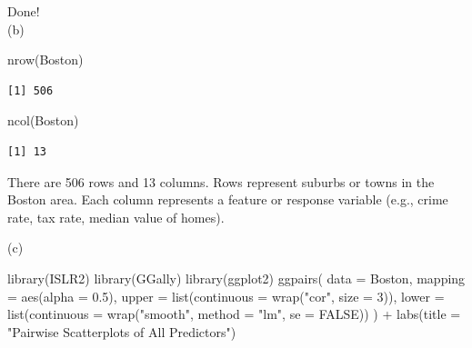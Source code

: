 \documentclass[
]{article}
\newenvironment{Shaded}{\begin{snugshade}}{\end{snugshade}}
\newcommand{\AttributeTok}[1]{\textcolor[rgb]{0.40,0.45,0.13}{#1}}
\newcommand{\ConstantTok}[1]{\textcolor[rgb]{0.56,0.35,0.01}{#1}}
\newcommand{\DecValTok}[1]{\textcolor[rgb]{0.68,0.00,0.00}{#1}}
\newcommand{\FloatTok}[1]{\textcolor[rgb]{0.68,0.00,0.00}{#1}}
\newcommand{\FunctionTok}[1]{\textcolor[rgb]{0.28,0.35,0.67}{#1}}
\newcommand{\NormalTok}[1]{\textcolor[rgb]{0.00,0.23,0.31}{#1}}
\newcommand{\SpecialCharTok}[1]{\textcolor[rgb]{0.37,0.37,0.37}{#1}}
\newcommand{\StringTok}[1]{\textcolor[rgb]{0.13,0.47,0.30}{#1}}
\begin{document}
Done!\\
(b)

\begin{Shaded}
\begin{Highlighting}[]
\FunctionTok{nrow}\NormalTok{(Boston)  }
\end{Highlighting}
\end{Shaded}

\begin{verbatim}
[1] 506
\end{verbatim}

\begin{Shaded}
\begin{Highlighting}[]
\FunctionTok{ncol}\NormalTok{(Boston)  }
\end{Highlighting}
\end{Shaded}

\begin{verbatim}
[1] 13
\end{verbatim}

There are 506 rows and 13 columns. Rows represent suburbs or towns in
the Boston area. Each column represents a feature or response variable
(e.g., crime rate, tax rate, median value of homes).

(c)

\begin{Shaded}
\begin{Highlighting}[]
\FunctionTok{library}\NormalTok{(ISLR2)}
\FunctionTok{library}\NormalTok{(GGally)}
\FunctionTok{library}\NormalTok{(ggplot2)}
\FunctionTok{ggpairs}\NormalTok{(}
  \AttributeTok{data =}\NormalTok{ Boston,  }
  \AttributeTok{mapping =} \FunctionTok{aes}\NormalTok{(}\AttributeTok{alpha =} \FloatTok{0.5}\NormalTok{),}
  \AttributeTok{upper =} \FunctionTok{list}\NormalTok{(}\AttributeTok{continuous =} \FunctionTok{wrap}\NormalTok{(}\StringTok{"cor"}\NormalTok{, }\AttributeTok{size =} \DecValTok{3}\NormalTok{)), }
  \AttributeTok{lower =} \FunctionTok{list}\NormalTok{(}\AttributeTok{continuous =} \FunctionTok{wrap}\NormalTok{(}\StringTok{"smooth"}\NormalTok{, }\AttributeTok{method =} \StringTok{"lm"}\NormalTok{, }\AttributeTok{se =} \ConstantTok{FALSE}\NormalTok{))}
\NormalTok{) }\SpecialCharTok{+} 
  \FunctionTok{labs}\NormalTok{(}\AttributeTok{title =} \StringTok{"Pairwise Scatterplots of All Predictors"}\NormalTok{)}
\end{Highlighting}
\end{Shaded}
\end{document}
